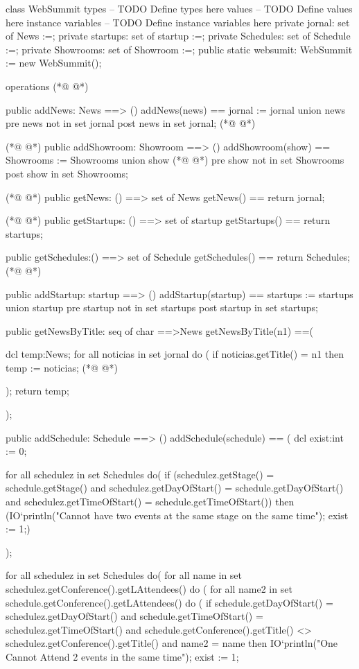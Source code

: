 \begin{vdmpp}[breaklines=true]
class WebSummit
types
-- TODO Define types here
values
-- TODO Define values here
instance variables
-- TODO Define instance variables here
  private jornal: set of News :={};
  private startups: set of startup :={};
  private Schedules: set of Schedule :={};
  private Showrooms: set of Showroom :={};
  public static websumit: WebSummit := new WebSummit();
  
operations
(*@
\label{addNews:15}
@*)

public addNews: News ==> ()
addNews(news) == jornal := jornal union {news}
pre news not in set jornal
post news in set jornal;
(*@
\label{getNews:20}
@*)

(*@
\label{addShowroom:21}
@*)
public addShowroom: Showroom ==> ()
addShowroom(show) == Showrooms := Showrooms union {show}
(*@
\label{getStartups:23}
@*)
pre show not in set Showrooms
post show in set Showrooms;

(*@
\label{getSchedules:26}
@*)
public getNews: () ==> set of News
getNews() == return jornal;

(*@
\label{addStartup:29}
@*)
public getStartups: () ==> set of startup
getStartups() == return startups;

public getSchedules:() ==> set of Schedule
getSchedules() == return Schedules;
(*@
\label{getNewsByTitle:34}
@*)

public addStartup: startup ==> ()
addStartup(startup) == startups := startups union {startup}
pre startup not in set startups
post startup in set startups;

public getNewsByTitle: seq of char ==>News
getNewsByTitle(n1) ==(

    dcl temp:News;
    for all noticias in set jornal do
    (
      if noticias.getTitle() = n1
      then temp := noticias;
(*@
\label{addSchedule:48}
@*)
    
    );
    return temp;
  
);

public addSchedule: Schedule ==> ()
addSchedule(schedule) == (
   dcl exist:int := 0;
   
  for all schedulez in set Schedules do(
    if (schedulez.getStage() = schedule.getStage() and schedulez.getDayOfStart() = schedule.getDayOfStart() and schedulez.getTimeOfStart() = schedule.getTimeOfStart())
    then 
    (IO`println("Cannot have two events at the same stage on the same time");
    exist := 1;)
    
  );
  
  for all schedulez in set Schedules do(
    for all name in set schedulez.getConference().getLAttendees() do
    (
      for all name2 in set schedule.getConference().getLAttendees() do
      (
         if schedule.getDayOfStart() = schedulez.getDayOfStart() and schedule.getTimeOfStart() = schedulez.getTimeOfStart() and schedule.getConference().getTitle() <> schedulez.getConference().getTitle() and name2 = name
         then IO`println("One Cannot Attend 2 events in the same time");
        exist := 1;
         

\end{vdmpp}
